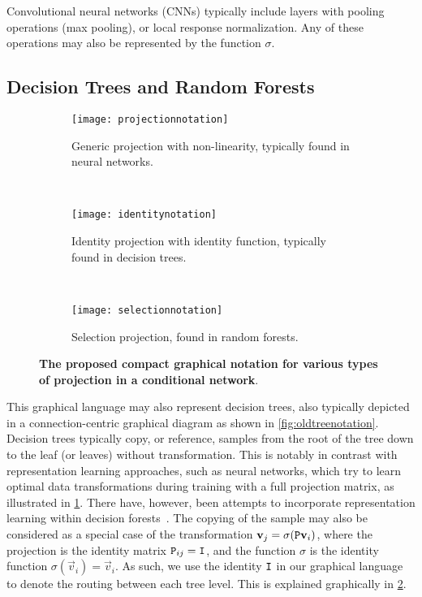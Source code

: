\documentclass[thesis]{subfiles}
\begin{document}
	Convolutional neural networks (CNNs) typically include layers with pooling operations (\eg max pooling), or local response normalization. Any of these operations may also be represented by the function $\sigma$.
	
	\subsection{Decision Trees and Random Forests}
	
	\begin{figure}[tbp] 
		\centering
		\begin{subfigure}[b]{\textwidth}
			\centering
			\texttt{[image: projectionnotation]}
			\caption{Generic projection with non-linearity, typically found in neural networks.}
			\label{fig:projectionnotation}
		\end{subfigure}
		~
		\begin{subfigure}[b]{\textwidth}
			\centering
			\texttt{[image: identitynotation]}
			\caption{Identity projection with identity function, typically found in decision trees.}
			\label{fig:identitynotation}
		\end{subfigure}
		~
		\begin{subfigure}[b]{\textwidth}
			\centering
			\texttt{[image: selectionnotation]}
			\caption{Selection projection, found in random forests.}
			\label{fig:selectionnotation}
		\end{subfigure}
		\caption[Various projection matrices in conditional networks.]{{\bf The proposed compact graphical notation for various types of projection in a conditional network}.}
		\label{fig:projections}
	\end{figure}
	
	This graphical language may also represent decision trees, also typically depicted in a connection-centric graphical diagram as shown in \cref{fig:oldtreenotation}. Decision trees typically copy, or reference, samples from the root of the tree down to the leaf (or leaves) without transformation. This is notably in contrast with representation learning approaches, such as neural networks, which try to learn optimal data transformations during training with a full projection matrix, as illustrated in \cref{fig:projectionnotation}. There have, however, been attempts to incorporate representation learning within decision forests~\citep{montillo2011entangled,BuloKontsch2014}. The copying of the sample may also be considered as a special case of the transformation $\vec v_j = \sigma(\mat P \vec v_i)$, where the projection is the identity matrix $\mat P_{ij} = \mat I$, and the function $\sigma$ is the identity function $\sigma(\vec v_i) = \vec v_i$. As such, we use the identity $\mat I$ in our graphical language to denote the routing between each tree level. This is explained graphically in \cref{fig:identitynotation}.
	
\end{document}

